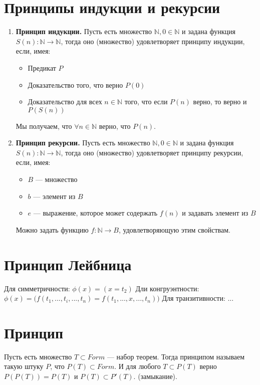 



\section{Принципы индукции и рекурсии}

\begin{enumerate}
	\item \textbf{Принцип индукции.} Пусть есть множество $\mathbb{N}, 0 \in \mathbb{N}$ и задана функция $S(n): \mathbb{N} \rightarrow \mathbb{N}$, тогда оно (множество) удовлетворяет принципу индукции, если, имея: 
	\begin{itemize}
		\item Предикат $P$
		\item Доказательство того, что верно $P(0)$
		\item Доказательство для всех $n \in \mathbb{N}$ того, что если $P(n)$ верно, то верно и $P(S(n))$
	\end{itemize}
	Мы получаем, что $\forall n \in \mathbb{N}$ верно, что $P(n)$.

	\item \textbf{Принцип рекурсии.} Пусть есть множество $\mathbb{N}, 0 \in \mathbb{N}$ и задана функция $S(n): \mathbb{N} \rightarrow \mathbb{N}$, тогда оно (множество) удовлетворяет принципу рекурсии, если, имея:
	\begin{itemize}
		\item $B$ --- множество
		\item $b$ --- элемент из $B$
		\item $e$ --- выражение, которое может содержать $f(n)$ и задавать элемент из $B$
	\end{itemize} 
	Можно задать функцию $f: \mathbb{N} \rightarrow B$, удовлетворяющую этим свойствам.
\end{enumerate}

\section{Принцип Лейбница}

Для симметричности: $\phi(x) = (x = t_2)$
Дли конгруэнтности: $\phi(x) = \big( f(t_1, ..., t_i, ..., t_n) = f(t_1,...,x,...,t_n)\big)$ 
Для транзитивности: ...

\section{Принцип}
Пусть есть множество $T \subset Form$ --- набор теорем. Тогда принципом называем такую штуку $P$, что $P(T) \subset Form$. И для любого $T \subset P(T)$ верно $P(P(T)) = P(T)$ и $P(T) \subset P'(T)$. (замыкание).


